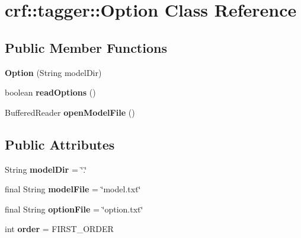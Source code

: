 \hypertarget{classcrf_1_1tagger_1_1Option}{
\section{crf::tagger::Option Class Reference}
\label{classcrf_1_1tagger_1_1Option}
}
\subsection*{Public Member Functions}
\begin{DoxyCompactItemize}
\item 
\hypertarget{classcrf_1_1tagger_1_1Option_a9ae663230bea89993782ead9ef620750}{
{\bfseries Option} (String modelDir)}
\label{classcrf_1_1tagger_1_1Option_a9ae663230bea89993782ead9ef620750}

\item 
\hypertarget{classcrf_1_1tagger_1_1Option_abae376c16ff2a958bfd8d19d11c68f27}{
boolean {\bfseries readOptions} ()}
\label{classcrf_1_1tagger_1_1Option_abae376c16ff2a958bfd8d19d11c68f27}

\item 
\hypertarget{classcrf_1_1tagger_1_1Option_abe4bd96f7d799a80be3ec4bfdb5bfa6b}{
BufferedReader {\bfseries openModelFile} ()}
\label{classcrf_1_1tagger_1_1Option_abe4bd96f7d799a80be3ec4bfdb5bfa6b}

\end{DoxyCompactItemize}
\subsection*{Public Attributes}
\begin{DoxyCompactItemize}
\item 
\hypertarget{classcrf_1_1tagger_1_1Option_a2f40eb1811239e21cd0306b05240922e}{
String {\bfseries modelDir} = \char`\"{}.\char`\"{}}
\label{classcrf_1_1tagger_1_1Option_a2f40eb1811239e21cd0306b05240922e}

\item 
\hypertarget{classcrf_1_1tagger_1_1Option_a060c453b1239bafaf0d87c7a388affa4}{
final String {\bfseries modelFile} = \char`\"{}model.txt\char`\"{}}
\label{classcrf_1_1tagger_1_1Option_a060c453b1239bafaf0d87c7a388affa4}

\item 
\hypertarget{classcrf_1_1tagger_1_1Option_ab7b89511a3ef544c6280d912c3c2470e}{
final String {\bfseries optionFile} = \char`\"{}option.txt\char`\"{}}
\label{classcrf_1_1tagger_1_1Option_ab7b89511a3ef544c6280d912c3c2470e}

\item 
\hypertarget{classcrf_1_1tagger_1_1Option_a26cae0d5297b5b93ec93b3864a577591}{
int {\bfseries order} = FIRST\_\-ORDER}
\label{classcrf_1_1tagger_1_1Option_a26cae0d5297b5b93ec93b3864a577591}

\end{DoxyCompactItemize}
